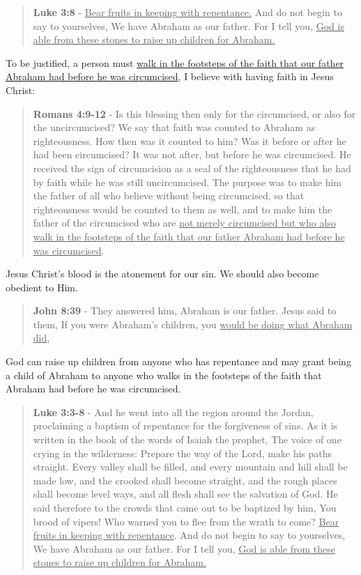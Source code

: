 \documentclass[11pt]{article}
\begin{document}
\begin{quote}
\textbf{Luke 3:8} - \uline{Bear fruits in keeping with repentance.} And do not begin to say to yourselves, We have Abraham as our father. For I tell you, \uline{God is able from these stones to raise up children for Abraham.}
\end{quote}

To be justified, a person must \uline{walk in the footsteps of the faith that our father Abraham had before he was circumcised}, I believe with having faith in Jesus Christ:

\begin{quote}
\textbf{Romans 4:9-12} - Is this blessing then only for the circumcised, or also for the uncircumcised? We say that faith was counted to Abraham as righteousness. How then was it counted to him? Was it before or after he had been circumcised? It was not after, but before he was circumcised. He received the sign of circumcision as a seal of the righteousness that he had by faith while he was still uncircumcised. The purpose was to make him the father of all who believe without being circumcised, so that righteousness would be counted to them as well, and to make him the father of the circumcised who are \uline{not merely circumcised but who also walk in the footsteps of the faith that our father Abraham had before he was circumcised}.
\end{quote}

Jesus Christ's blood is the atonement for our sin.
We should also become obedient to Him.

\begin{quote}
\textbf{John 8:39} - They answered him, Abraham is our father. Jesus said to them, If you were Abraham's children, you \uline{would be doing what Abraham did},
\end{quote}

God can raise up children from anyone who has repentance and may grant being a child of Abraham to anyone who walks in the footsteps of the faith that Abraham had before he was circumcised.

\begin{quote}
\textbf{Luke 3:3-8} - And he went into all the region around the Jordan, proclaiming a baptism of repentance for the forgiveness of sins. As it is written in the book of the words of Isaiah the prophet, The voice of one crying in the wilderness: Prepare the way of the Lord, make his paths straight. Every valley shall be filled, and every mountain and hill shall be made low, and the crooked shall become straight, and the rough places shall become level ways, and all flesh shall see the salvation of God. He said therefore to the crowds that came out to be baptized by him, You brood of vipers! Who warned you to flee from the wrath to come? \uline{Bear fruits in keeping with repentance}. And do not begin to say to yourselves, We have Abraham as our father. For I tell you, \uline{God is able from these stones to raise up children for Abraham.}
\end{quote}
\end{document}
